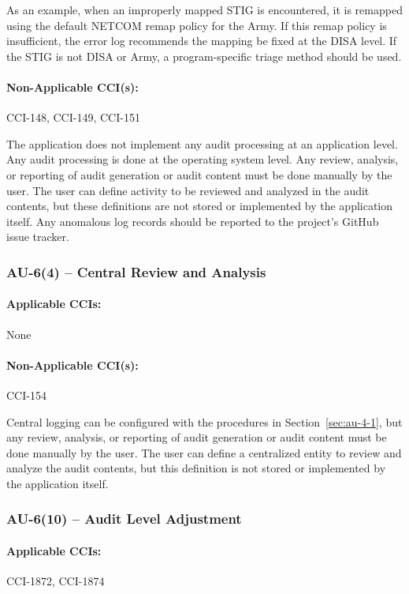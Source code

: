 \documentclass[letterpaper, 10pt, twoside]{article}
\begin{document}
As an example, when an improperly mapped STIG is encountered, it is remapped using the default NETCOM remap policy for the Army. If this remap policy is insufficient, the error log recommends the mapping be fixed at the DISA level. If the STIG is not DISA or Army, a program-specific triage method should be used.

\paragraph{Non-Applicable CCI(s):} CCI-148, CCI-149, CCI-151

The application does not implement any audit processing at an application level. Any audit processing is done at the operating system level. Any review, analysis, or reporting of audit generation or audit content must be done manually by the user. The user can define activity to be reviewed and analyzed in the audit contents, but these definitions are not stored or implemented by the application itself. Any anomalous log records should be reported to the project's GitHub issue tracker.

\subsubsection{AU-6(4) -- Central Review and Analysis}

\paragraph{Applicable CCIs:} None

\paragraph{Non-Applicable CCI(s):} CCI-154

Central logging can be configured with the procedures in Section~\ref{sec:au-4-1}, but any review, analysis, or reporting of audit generation or audit content must be done manually by the user. The user can define a centralized entity to review and analyze the audit contents, but this definition is not stored or implemented by the application itself.

\subsubsection{AU-6(10) -- Audit Level Adjustment}

\paragraph{Applicable CCIs:} CCI-1872, CCI-1874
\end{document}
